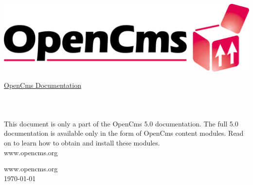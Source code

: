 
\begin{titlepage}
\begin{flushright}
  \includegraphics[width=0.4\linewidth]{pics/logo}
\end{flushright}
\vspace{8cm}
\Huge
\titleFont \underline{OpenCms Documentation}\\
\\
\\
\normalsize
\\
This document is only a part of the OpenCms 5.0 documentation.
The full 5.0 documentation is available only in the form of OpenCms content modules.
Read on to learn how to obtain and install these modules.\\
\vfill
www.opencms.org
\end{titlepage}

\newpage
\thispagestyle{empty}
\vspace*{\fill}
www.opencms.org\\
\today

